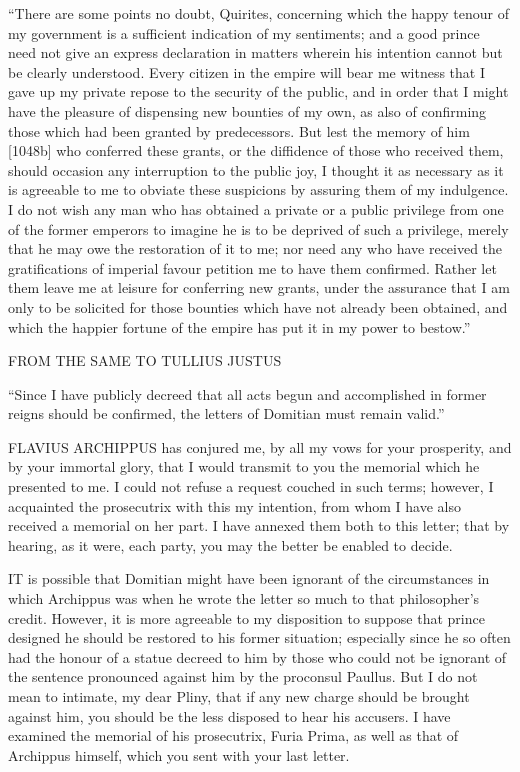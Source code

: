 ``There are some points no doubt, Quirites, concerning which the happy
tenour of my government is a sufficient indication of my sentiments; and a
good prince need not give an express declaration in matters wherein his
intention cannot but be clearly understood. Every citizen in the empire
will bear me witness that I gave up my private repose to the security of
the public, and in order that I might have the pleasure of dispensing new
bounties of my own, as also of confirming those which had been granted by
predecessors. But lest the memory of him [1048b] who conferred
these grants, or the diffidence of those who received them, should
occasion any interruption to the public joy, I thought it as necessary as
it is agreeable to me to obviate these suspicions by assuring them of my
indulgence. I do not wish any man who has obtained a private or a public
privilege from one of the former emperors to imagine he is to be deprived
of such a privilege, merely that he may owe the restoration of it to me;
nor need any who have received the gratifications of imperial favour
petition me to have them confirmed. Rather let them leave me at leisure
for conferring new grants, under the assurance that I am only to be
solicited for those bounties which have not already been obtained, and
which the happier fortune of the empire has put it in my power to bestow.''

FROM THE SAME TO TULLIUS JUSTUS

``Since I have publicly decreed that all acts begun and accomplished in
former reigns should be confirmed, the letters of Domitian must remain
valid.''


FLAVIUS ARCHIPPUS has conjured me, by all my vows for your prosperity, and
by your immortal glory, that I would transmit to you the memorial which he
presented to me. I could not refuse a request couched in such terms;
however, I acquainted the prosecutrix with this my intention, from whom I
have also received a memorial on her part. I have annexed them both to
this letter; that by hearing, as it were, each party, you may the better
be enabled to decide.


IT is possible that Domitian might have been ignorant of the circumstances
in which Archippus was when he wrote the letter so much to that
philosopher's credit. However, it is more agreeable to my disposition to
suppose that prince designed he should be restored to his former
situation; especially since he so often had the honour of a statue decreed
to him by those who could not be ignorant of the sentence pronounced
against him by the proconsul Paullus. But I do not mean to intimate, my
dear Pliny, that if any new charge should be brought against him, you
should be the less disposed to hear his accusers. I have examined the
memorial of his prosecutrix, Furia Prima, as well as that of Archippus
himself, which you sent with your last letter.

